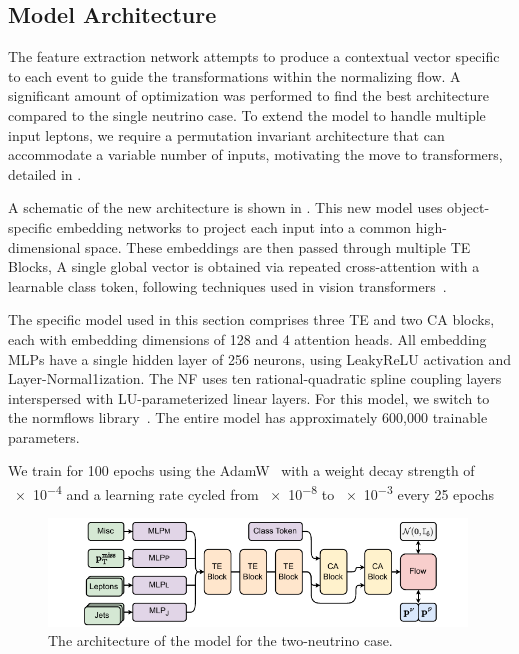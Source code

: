 \subsection{Model Architecture}

The feature extraction network attempts to produce a contextual vector specific to each event to guide the transformations within the normalizing flow.
A significant amount of optimization was performed to find the best architecture compared to the single neutrino case.
To extend the model to handle multiple input leptons, we require a permutation invariant architecture that can accommodate a variable number of inputs, motivating the move to transformers, detailed in .

A schematic of the new \vvflows architecture is shown in .
This new model uses object-specific embedding networks to project each input into a common high-dimensional space.
These embeddings are then passed through multiple TE Blocks,
A single global vector is obtained via repeated cross-attention with a learnable class token, following techniques used in vision transformers~\cite{GoingDeeper}.

The specific model used in this section comprises three TE and two CA blocks, each with embedding dimensions of 128 and 4 attention heads.
All embedding MLPs have a single hidden layer of 256 neurons, using LeakyReLU activation and Layer-Normal1ization.
The NF uses ten rational-quadratic spline coupling layers interspersed with LU-parameterized linear layers.
For this model, we switch to the normflows library~\cite{Stimper2023}.
The entire \vvflows model has approximately 600,000 trainable parameters.

We train for 100 epochs using the AdamW~\cite{AdamW} with a weight decay strength of \num{e-4} and a learning rate cycled from \num{e-8} to \num{e-3} every 25 epochs

\begin{figure}[ht]
    \centering
    \includegraphics[width=0.99\textwidth]{Figures/neutrino_unfolding/nu2flow.pdf}
    \caption{The architecture of the \vvflows model for the two-neutrino case.}
    \label{fig:nunuflows}
\end{figure}

